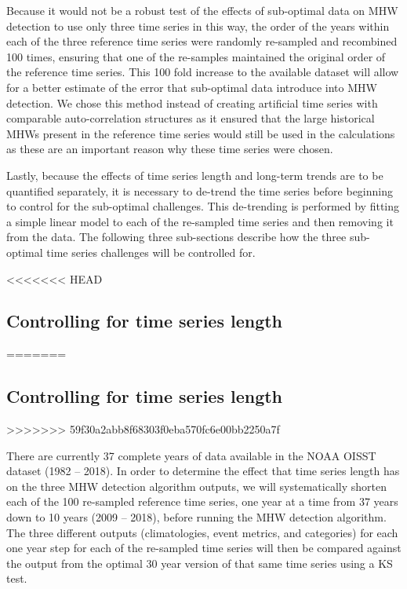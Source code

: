 \documentclass[]{article}
\begin{document}
{Because it would not be a robust test of the effects of sub-optimal data
on MHW detection to use only three time series in this way, the order of
the years within each of the three reference time series were randomly
re-sampled and recombined 100 times, ensuring that one of the re-samples
maintained the original order of the reference time series. This 100
fold increase to the available dataset will allow for a better estimate
of the error that sub-optimal data introduce into MHW detection. We
chose this method instead of creating artificial time series with
comparable auto-correlation structures as it ensured that the large
historical MHWs present in the reference time series would still be used
in the calculations as these are an important reason why these time
series were chosen.

Lastly, because the effects of time series length and long-term trends
are to be quantified separately, it is necessary to de-trend the time
series before beginning to control for the sub-optimal challenges. This
de-trending is performed by fitting a simple linear model to each of the
re-sampled time series and then removing it from the data. The following
three sub-sections describe how the three sub-optimal time series
challenges will be controlled for.

<<<<<<< HEAD
\hypertarget{controlling-for-time-series-length}{%
\subsection{Controlling for time series
length}\label{controlling-for-time-series-length}}
=======
\subsection{Controlling for time series
length}\label{controlling-for-time-series-length}
>>>>>>> 59f30a2abb8f68303f0eba570fc6e00bb2250a7f

There are currently 37 complete years of data available in the NOAA
OISST dataset (1982 -- 2018). In order to determine the effect that time
series length has on the three MHW detection algorithm outputs, we will
systematically shorten each of the 100 re-sampled reference time series,
one year at a time from 37 years down to 10 years (2009 -- 2018), before
running the MHW detection algorithm. The three different outputs
(climatologies, event metrics, and categories) for each one year step
for each of the re-sampled time series will then be compared against the
output from the optimal 30 year version of that same time series using a
KS test.

}
\end{document}
